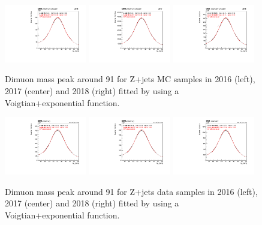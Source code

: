 \begin{figure}[h!]
    \centering
    \includegraphics[width=0.32\textwidth]{images_geofit/DY_MC_mass_geofit_2016.pdf}
    \includegraphics[width=0.32\textwidth]{images_geofit/DY_MC_mass_geofit_2017.pdf}
    \includegraphics[width=0.32\textwidth]{images_geofit/DY_MC_mass_geofit_2018.pdf}
    \caption{Dimuon mass peak around 91 \gev for Z+jets MC samples in 2016 (left), 2017 (center) and 2018 (right) fitted by using a Voigtian+exponential function.}
    \label{fig:dimu_mass_DY_MC}
\end{figure}

\begin{figure}[h!]
    \centering
    \includegraphics[width=0.32\textwidth]{images_geofit/DY_data_mass_geofit_2016.pdf}
    \includegraphics[width=0.32\textwidth]{images_geofit/DY_data_mass_geofit_2017.pdf}
    \includegraphics[width=0.32\textwidth]{images_geofit/DY_data_mass_geofit_2018.pdf}
    \caption{Dimuon mass peak around 91 \gev for Z+jets data samples in 2016 (left), 2017 (center) and 2018 (right) fitted by using a Voigtian+exponential function.}
    \label{fig:dimu_mass_DY_data}
\end{figure}

